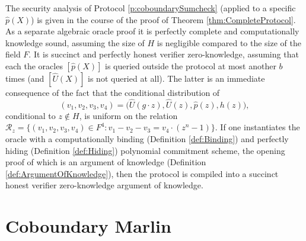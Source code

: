 \documentclass[10pt,article,oneside]{memoir}
\theoremstyle{definition}
\theoremstyle{remark}
\begin{document}

The security analysis of Protocol \ref{p:coboundarySumcheck} (applied to a specific $\hat p(X)$) is given in the course of the proof of Theorem \ref{thm:CompleteProtocol}.
As a separate algebraic oracle proof it is perfectly complete and computationally knowledge sound, assuming the size of $H$ is negligible compared to the size of the field $F$.  
It is succinct and perfectly honest verifier zero-knowledge, assuming that each the oracles $[\hat p(X)]$ is queried outside the protocol at most another $b$ times (and $[\hat U(X)]$ is not queried at all). 
The latter is an immediate consequence of the fact that the conditional distribution of 
\[
(v_1,v_2,v_3,v_4)= \big(\hat U(g\cdot z), \hat U(z), \hat p(z), h(z)\big),
\]
conditional to $z\notin H$, is uniform on the relation $\mathcal R_z = \{(v_1,v_2,v_3,v_4)\in F^4: v_1 -v_2 - v_3 = v_4\cdot (z^n-1)\}$.
If one instantiates the oracle with a computationally binding (Definition \ref{def:Binding}) and perfectly hiding (Definition \ref{def:Hiding}) polynomial commitment scheme, the opening proof of which is an argument of knowledge (Definition \ref{def:ArgumentOfKnowledge}), then the protocol is compiled into a succinct honest verifier zero-knowledge argument of knowledge.





\chapter{Coboundary Marlin}
\label{s:Marlin}
\end{document}
